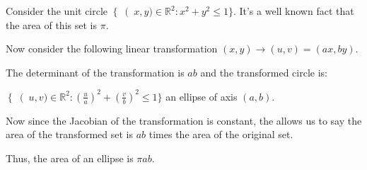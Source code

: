 \documentclass[12pt]{article}
\begin{document}
Consider the unit circle $\left \{ \right (x,y) \in \mathbb{R}^2 : x^2+y^2\le 1\}$. It's a well known fact that the area of this set is $\pi$.

Now consider the following linear transformation $(x,y)\to(u,v)=(ax,by)$.

The determinant of the transformation is $ab$ and the transformed circle is:

 $\left \{ \right (u,v) \in \mathbb{R}^2 : \left (\frac{u}{a} \right )^2 + \left (\frac{v}{b} \right )^2 \le 1\}$  an ellipse of axis $(a,b)$.

Now since the Jacobian of the transformation is constant, the  allows us to say the area of the transformed set is $ab$ 
times the area of the original set.

Thus, the area of an ellipse is $\pi a b$.
\end{document}
